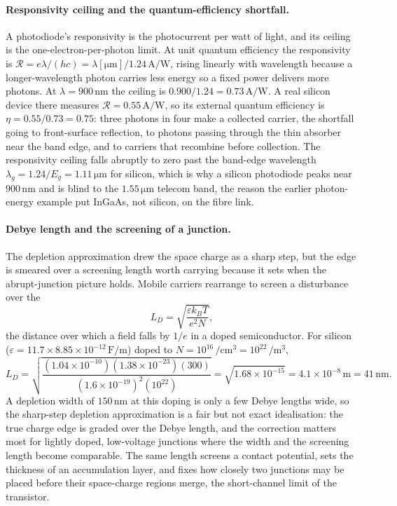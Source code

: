 \paragraph{Responsivity ceiling and the quantum-efficiency shortfall.}
A photodiode's responsivity is the photocurrent per watt of light, and its
ceiling is the one-electron-per-photon limit. At unit quantum efficiency the
responsivity is $\mathcal{R} = e\lambda/(hc) = \lambda[\si{\micro\meter}]/
1.24\,\si{\ampere\per\watt}$, rising linearly with wavelength because a
longer-wavelength photon carries less energy so a fixed power delivers more
photons. At $\lambda = 900\,\si{\nano\meter}$ the ceiling is $0.900/1.24 =
0.73\,\si{\ampere\per\watt}$. A real silicon device there measures
$\mathcal{R} = 0.55\,\si{\ampere\per\watt}$, so its external quantum
efficiency is $\eta = 0.55/0.73 = 0.75$: three photons in four make a
collected carrier, the shortfall going to front-surface reflection, to
photons passing through the thin absorber near the band edge, and to
carriers that recombine before collection. The responsivity ceiling falls
abruptly to zero past the band-edge wavelength $\lambda_g = 1.24/E_g =
1.11\,\si{\micro\meter}$ for silicon, which is why a silicon photodiode
peaks near $900\,\si{\nano\meter}$ and is blind to the $1.55\,\si{\micro
\meter}$ telecom band, the reason the earlier photon-energy example put
InGaAs, not silicon, on the fibre link.

\paragraph{Debye length and the screening of a junction.}
The depletion approximation drew the space charge as a sharp step, but the
edge is smeared over a screening length worth carrying because it sets when
the abrupt-junction picture holds. Mobile carriers rearrange to screen a
disturbance over the 
\[
L_D = \sqrt{\frac{\varepsilon k_BT}{e^{2}N}},
\]
the distance over which a field falls by $1/e$ in a doped semiconductor. For
silicon ($\varepsilon = 11.7\times 8.85\times 10^{-12}\,\si{\farad\per
\meter}$) doped to $N = 10^{16}\,\si{\per\centi\meter\cubed} = 10^{22}\,\si{
\per\meter\cubed}$,
\[
L_D = \sqrt{\frac{(1.04\times 10^{-10})(1.38\times 10^{-23})(300)}
                 {(1.6\times 10^{-19})^{2}(10^{22})}}
    = \sqrt{1.68\times 10^{-15}}
    = 4.1\times 10^{-8}\,\si{\meter}
    = 41\,\si{\nano\meter}.
\]
A depletion width of $150\,\si{\nano\meter}$ at this doping is only a few
Debye lengths wide, so the sharp-step depletion approximation is a fair but
not exact idealisation: the true charge edge is graded over the Debye
length, and the correction matters most for lightly doped, low-voltage
junctions where the width and the screening length become comparable. The
same length screens a contact potential, sets the thickness of an
accumulation layer, and fixes how closely two junctions may be placed before
their space-charge regions merge, the short-channel limit of the transistor.


